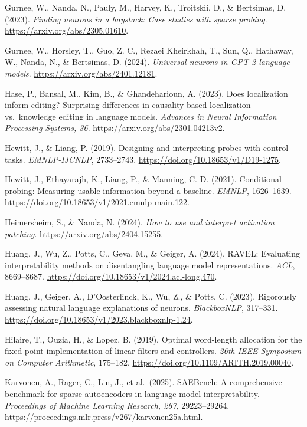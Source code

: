 \documentclass[
  british,
  11pt,
  a4paper,
]{article}
\begin{document}
Gurnee, W., Nanda, N., Pauly, M., Harvey, K., Troitskii, D., \&
Bertsimas, D. (2023). \emph{Finding neurons in a haystack: Case studies
with sparse probing}. \url{https://arxiv.org/abs/2305.01610}.

Gurnee, W., Horsley, T., Guo, Z. C., Rezaei Kheirkhah, T., Sun, Q.,
Hathaway, W., Nanda, N., \& Bertsimas, D. (2024). \emph{Universal
neurons in GPT-2 language models}.
\url{https://arxiv.org/abs/2401.12181}.

Hase, P., Bansal, M., Kim, B., \& Ghandeharioun, A. (2023). Does
localization inform editing? Surprising differences in causality-based
localization vs.~knowledge editing in language models. \emph{Advances in
Neural Information Processing Systems, 36}.
\url{https://arxiv.org/abs/2301.04213v2}.

Hewitt, J., \& Liang, P. (2019). Designing and interpreting probes with
control tasks. \emph{EMNLP-IJCNLP}, 2733--2743.
\url{https://doi.org/10.18653/v1/D19-1275}.

Hewitt, J., Ethayarajh, K., Liang, P., \& Manning, C. D. (2021).
Conditional probing: Measuring usable information beyond a baseline.
\emph{EMNLP}, 1626--1639.
\url{https://doi.org/10.18653/v1/2021.emnlp-main.122}.

Heimersheim, S., \& Nanda, N. (2024). \emph{How to use and interpret
activation patching}. \url{https://arxiv.org/abs/2404.15255}.

Huang, J., Wu, Z., Potts, C., Geva, M., \& Geiger, A. (2024). RAVEL:
Evaluating interpretability methods on disentangling language model
representations. \emph{ACL}, 8669--8687.
\url{https://doi.org/10.18653/v1/2024.acl-long.470}.

Huang, J., Geiger, A., D'Oosterlinck, K., Wu, Z., \& Potts, C. (2023).
Rigorously assessing natural language explanations of neurons.
\emph{BlackboxNLP}, 317--331.
\url{https://doi.org/10.18653/v1/2023.blackboxnlp-1.24}.

Hilaire, T., Ouzia, H., \& Lopez, B. (2019). Optimal word-length
allocation for the fixed-point implementation of linear filters and
controllers. \emph{26th IEEE Symposium on Computer Arithmetic},
175--182. \url{https://doi.org/10.1109/ARITH.2019.00040}.

Karvonen, A., Rager, C., Lin, J., et al.~(2025). SAEBench: A
comprehensive benchmark for sparse autoencoders in language model
interpretability. \emph{Proceedings of Machine Learning Research, 267},
29223--29264. \url{https://proceedings.mlr.press/v267/karvonen25a.html}.
\end{document}

